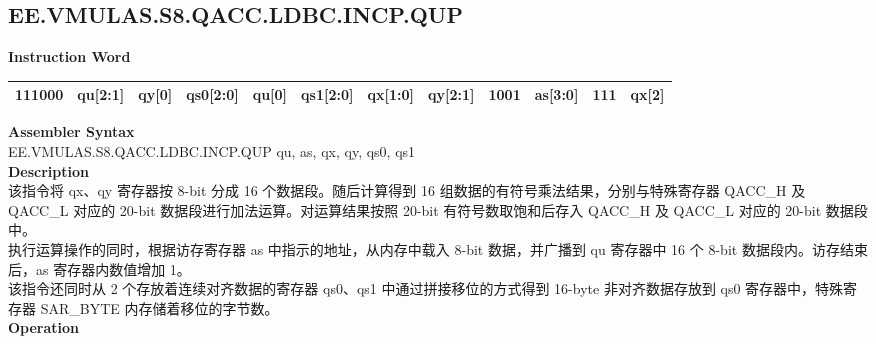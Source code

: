 \clearpage
\subsection{EE.VMULAS.S8.QACC.LDBC.INCP.QUP}\label{instruction:EEVMULASS8QACCLDBCINCPQUP}
\setlength\tabcolsep{6pt}
\textbf{Instruction Word} \\
\begin{tabular}{|c|c|c|c|c|c|c|c|c|c|c|c|}
	\hline
	111000 & qu[2:1] & qy[0] & qs0[2:0] & qu[0] & qs1[2:0] & qx[1:0] & qy[2:1] & 1001 & as[3:0] & 111 & qx[2] \\
	\hline
\end{tabular}

\textbf{Assembler Syntax} \\
EE.VMULAS.S8.QACC.LDBC.INCP.QUP qu, as, qx, qy, qs0, qs1 \\
\textbf{Description} \\
该指令将 qx、qy 寄存器按 8-bit 分成 16 个数据段。随后计算得到 16 组数据的有符号乘法结果，分别与特殊寄存器 QACC\_H 及 QACC\_L 对应的 20-bit 数据段进行加法运算。对运算结果按照 20-bit 有符号数取饱和后存入 QACC\_H 及 QACC\_L 对应的 20-bit 数据段中。\\
执行运算操作的同时，根据访存寄存器 as 中指示的地址，从内存中载入 8-bit 数据，并广播到 qu 寄存器中 16 个 8-bit 数据段内。访存结束后，as 寄存器内数值增加 1。\\
该指令还同时从 2 个存放着连续对齐数据的寄存器 qs0、qs1 中通过拼接移位的方式得到 16-byte 非对齐数据存放到 qs0 寄存器中，特殊寄存器 SAR\_BYTE 内存储着移位的字节数。\\
\textbf{Operation}
